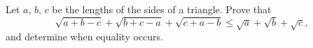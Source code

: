 Let $a$, $b$, $c$ be the lengths of the sides of a triangle.  Prove that \[ \sqrt{a+b-c} + \sqrt{b+c-a} + \sqrt{c+a-b} \leq \sqrt{a} + \sqrt{b} + \sqrt{c}, \] and determine when equality occurs.
